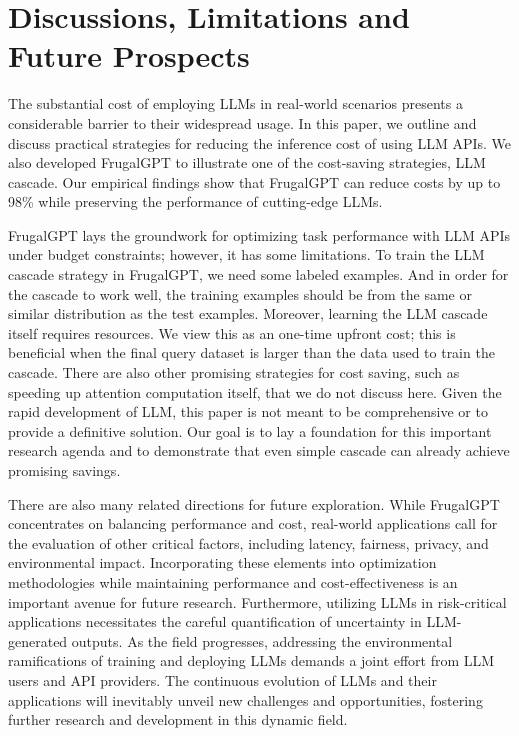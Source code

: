 \documentclass{article}
\numberwithin{equation}{section}
\newcommand{\systemFGPT}{{FrugalGPT}}
\begin{document}
\section{Discussions, Limitations and Future Prospects}\label{sec:AML:conclusion}
The substantial cost of employing LLMs in real-world scenarios presents a considerable barrier to their widespread usage. In this paper, we outline and discuss practical strategies for reducing the inference cost of using LLM APIs. We also developed \systemFGPT{} to illustrate one of the cost-saving strategies, LLM cascade.  
Our empirical findings show that \systemFGPT{} can reduce costs by up to 98\% while preserving the performance of cutting-edge LLMs.

\systemFGPT{} lays the groundwork for optimizing task performance with LLM APIs under budget constraints; however, it has some limitations. To train the LLM cascade strategy in \systemFGPT{}, we need some labeled examples. And in order for the cascade to work well, the training examples should be from the same or similar  distribution as the test examples. Moreover, learning the LLM cascade itself requires resources. We view this as an one-time upfront cost; this is beneficial when the final query dataset is larger than the data used to train the cascade. There are also other promising strategies for cost saving, such as speeding up attention computation itself, that we do not discuss here. Given the rapid development of LLM, this paper is not meant to be comprehensive or to provide a definitive solution. Our goal is to lay a foundation for this important research agenda and to demonstrate that even simple cascade can already achieve promising savings. 

There are also many related directions  for future exploration. While \systemFGPT{} concentrates on balancing performance and cost, real-world applications call for the evaluation of other critical factors, including latency, fairness, privacy, and environmental impact. Incorporating these elements into optimization methodologies while maintaining performance and cost-effectiveness is an important avenue for future research. Furthermore, utilizing LLMs in risk-critical applications necessitates the careful quantification of uncertainty in LLM-generated outputs. As the field progresses, addressing the environmental ramifications of training and deploying LLMs demands a joint effort from LLM users and API providers. The continuous evolution of LLMs and their applications will inevitably unveil new challenges and opportunities, fostering further research and development in this dynamic field.

\newpage



%
\end{document}
